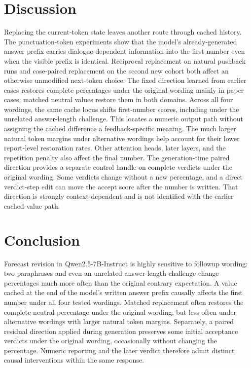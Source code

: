 \documentclass[10pt,letterpaper]{article}
\begin{document}
\section{Discussion}

Replacing the current-token state leaves another route through cached history. The punctuation-token experiments show that the model's already-generated answer prefix carries dialogue-dependent information into the first number even when the visible prefix is identical. Reciprocal replacement on natural pushback runs and case-paired replacement on the second new cohort both affect an otherwise unmodified next-token choice. The fixed direction learned from earlier cases restores complete percentages under the original wording mainly in paper cases; matched neutral values restore them in both domains. Across all four wordings, the same cache locus shifts first-number scores, including under the unrelated answer-length challenge. This locates a numeric output path without assigning the cached difference a feedback-specific meaning. The much larger natural token margins under alternative wordings help account for their lower report-level restoration rates. Other attention heads, later layers, and the repetition penalty also affect the final number. The generation-time paired direction provides a separate control handle on complete verdicts under the original wording. Some verdicts change without a new percentage, and a direct verdict-step edit can move the accept score after the number is written. That direction is strongly context-dependent and is not identified with the earlier cached-value path.

\pagebreak

\section{Conclusion}

Forecast revision in Qwen2.5-7B-Instruct is highly sensitive to followup wording: two paraphrases and even an unrelated answer-length challenge change percentages much more often than the original contrary expectation. A value cached at the end of the model's written answer prefix causally affects the first number under all four tested wordings. Matched replacement often restores the complete neutral percentage under the original wording, but less often under alternative wordings with larger natural token margins. Separately, a paired residual direction applied during generation preserves some initial acceptance verdicts under the original wording, occasionally without changing the percentage. Numeric reporting and the later verdict therefore admit distinct causal interventions within the same response.
\end{document}
